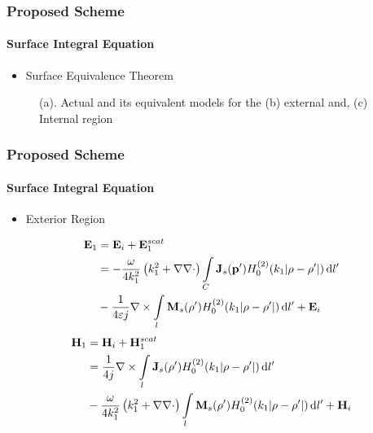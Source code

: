 \documentclass[mathserif,18pt,xcolor=table]{beamer}
\begin{document}
  \begin{frame}
    \frametitle{Proposed Scheme}
    \framesubtitle{Surface Integral Equation}

    \begin{itemize}
      \item{Surface Equivalence Theorem}
    \end{itemize}
    \begin{figure}
      \centering
      \def\svgwidth{1\linewidth}
      
      \caption{(a). Actual and its equivalent models for the (b) external and, (c) Internal region }
    \end{figure}
  \end{frame}
  \begin{frame}
    \frametitle{Proposed Scheme}
    \framesubtitle{Surface Integral Equation}
    \vspace*{-.4cm}
    \begin{itemize}
      \item{Exterior Region}
    \end{itemize}
    \begin{equation} \nonumber
      \begin{split}
        \mathbf{E}_1 &= \mathbf{E}_i + \mathbf{E}_1^{scat} \\
        &=  -\frac{\omega}{4 k_1^2} \left( k_1^2 + \nabla \nabla \cdot \right) \int\limits_{C} \mathbf{J}_s(\mathbf{p}') H_0^{(2)}(k_1 |\mathbf{\rho} - \mathbf{\rho}'|) \mathop{}\!\mathrm{d}{l'} \\
        &- \frac{1}{4 \varepsilon j} \nabla \times \int\limits_{l} \mathbf{M}_s(\mathbf{\rho}') H_0^{(2)}(k_1 |\mathbf{\rho} - \mathbf{\rho}'|) \mathop{}\!\mathrm{d}{l'} + \mathbf{E}_i
      \end{split}
      \label{eq:E1sc}
    \end{equation}
    \begin{equation} \nonumber
      \begin{split}
        \mathbf{H}_1 &= \mathbf{H}_i + \mathbf{H}_1^{scat} \\
        &= \frac{1}{4 j} \nabla \times \int\limits_{l} \mathbf{J}_s(\mathbf{\rho}') H_0^{(2)}(k_1 |\mathbf{\rho} - \mathbf{\rho}'|) \mathop{}\!\mathrm{d}{l'} \\
        &-\frac{\omega}{4 k_1^2} \left( k_1^2 + \nabla \nabla \cdot \right) \int\limits_{l} \mathbf{M}_s(\mathbf{\rho}') H_0^{(2)}(k_1 |\mathbf{\rho} - \mathbf{\rho}'|) \mathop{}\!\mathrm{d}{l'} + \mathbf{H}_i
      \end{split}
      \label{eq:H1sc}
    \end{equation}
  \end{frame}
\end{document}
